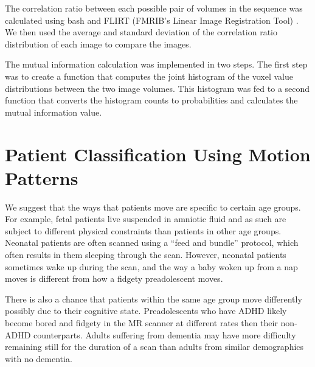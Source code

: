 The correlation ratio between each possible pair of volumes in the sequence was calculated using bash and FLIRT (FMRIB’s Linear Image Registration Tool) \cite{Jenkinson2001} \cite{Jenkinson2002}. We then used the average and standard deviation of the correlation ratio distribution of each image to compare the images.

The mutual information calculation was implemented in two steps. The first step was to create a function that computes the joint histogram of the voxel value distributions between the two image volumes. This histogram was fed to a second function that converts the histogram counts to probabilities and calculates the mutual information value. 


\section{Patient Classification Using Motion Patterns} 


We suggest that the ways that patients move are specific to certain age groups. For example, fetal patients live suspended in amniotic fluid and as such are subject to different physical constraints than patients in other age groups. Neonatal patients are often scanned using a ``feed and bundle'' protocol, which often results in them sleeping through the scan. However, neonatal patients sometimes wake up during the scan, and the way a baby woken up from a nap moves is different from how a fidgety preadolescent moves. %

There is also a chance that patients within the same age group move differently possibly due to their cognitive state. Preadolescents who have ADHD likely become bored and fidgety in the MR scanner at different rates then their non-ADHD counterparts. Adults suffering from dementia may have more difficulty remaining still for the duration of a scan than adults from similar demographics with no dementia.

